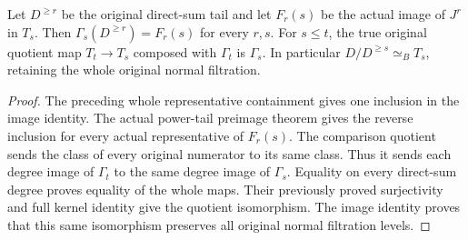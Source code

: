 \begin{theorem}
\label{hir:relative-normal-actual-power-lift-truncation-compatible-filtration}
\leanok
Let $D^{\geq r}$ be the original direct-sum tail and let $F_r(s)$ be
the actual image of $J^r$ in $T_s$. Then
$\Gamma_s(D^{\geq r})=F_r(s)$ for every $r,s$. For $s\leq t$, the
true original quotient map $T_t\to T_s$ composed with $\Gamma_t$ is
$\Gamma_s$. In particular $D/D^{\geq s}\simeq_B T_s$, retaining the
whole original normal filtration.
\end{theorem}
\begin{proof}
The preceding whole representative containment gives one inclusion
in the image identity. The actual power-tail preimage theorem gives
the reverse inclusion for every actual representative of $F_r(s)$.
The comparison quotient sends the class of every original numerator
to its same class. Thus it sends each degree image of $\Gamma_t$
to the same degree image of $\Gamma_s$. Equality on every direct-sum
degree proves equality of the whole maps. Their previously proved
surjectivity and full kernel identity give the quotient isomorphism.
The image identity proves that this same isomorphism preserves all
original normal filtration levels.
\end{proof}

